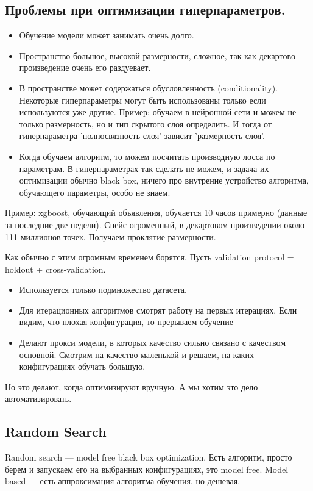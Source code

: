 \documentclass[12pt]{article}
\begin{document}
\subsection{Проблемы при оптимизации гиперпараметров.}
\begin{itemize}
    \item  Обучение модели может занимать очень долго.
    \item Пространство большое, высокой размерности, сложное, так как декартово произведение очень его раздуевает.
    \item В пространстве может содержаться обусловленность (conditionality). Некоторые гиперпараметры могут быть использованы только если используются уже другие. Пример: обучаем в нейронной сети и можем не только размерность, но и тип скрытого слоя определить. И тогда от гиперпараметра 'полносвязность слоя' зависит 'размерность слоя'.
    \item  Когда обучаем алгоритм, то можем посчитать производную лосса по параметрам. В гиперпараметрах так сделать не можем, и задача их оптимизации обычно black box, ничего про внутренне устройство алгоритма, обучающего параметры, особо не знаем.
\end{itemize}
Пример: xgboost, обучающий объявления, обучается 10 часов примерно (данные за последние две недели). Спейс огроменный, в декартовом произведении около 111 миллионов точек. Получаем проклятие размерности.

Как обычно с этим огромным временем борятся. Пусть validation protocol = holdout + cross-validation.
\begin{itemize}
    \item Используется только подмножество датасета.
    \item Для итерационных алгоритмов смотрят работу на первых итерациях. Если видим, что плохая конфигурация, то прерываем обучение
    \item Делают прокси модели, в которых качество сильно связано с качеством основной. Смотрим на качество маленькой и решаем, на каких конфигурациях обучать большую.
\end{itemize}
Но это делают, когда оптимизируют вручную. А мы хотим это дело автоматизировать.

\subsection{Random Search}
Random search --- model free black box optimization. Есть алгоритм, просто берем и запускаем его на выбранных конфигурациях, это model free. Model based --- есть аппроксимация алгоритма обучения, но дешевая.
    
\end{document}
